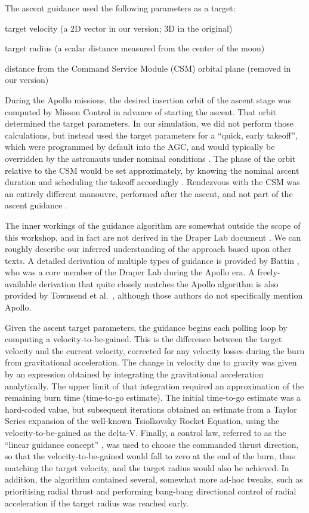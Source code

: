\documentclass[12pt,openany]{book}
\begin{document}
The ascent guidance used the following parameters as a target:
\begin{paritemize}
\item target velocity (a 2D vector in our version; 3D in the original)
\item target radius (a scalar distance measured from the center of the moon)
\item distance from the Command Service Module (CSM) orbital plane (removed in our version)
\end{paritemize}
During the Apollo missions, the desired insertion orbit of the ascent stage was computed by Misson Control in advance of starting the ascent. That orbit determined the target parameters. In our simulation, we did not perform those calculations, but instead used the target parameters for a ``quick, early takeoff'', which were programmed by default into the AGC, and would typically be overridden by the astronauts under nominal conditions \cite{levine1971}. The phase of the orbit relative to the CSM would be set approximately, by knowing the nominal ascent duration and scheduling the takeoff accordingly \cite{levine1971}. Rendezvous with the CSM was an entirely different manouvre, performed after the ascent, and not part of the ascent guidance \cite{levine1971}.

The inner workings of the guidance algorithm are somewhat outside the scope of this workshop, and in fact are not derived in the Draper Lab document \cite{levine1971}. We can roughly describe our inferred understanding of the approach based upon other texts. A detailed derivation of multiple types of guidance is provided by Battin \cite{battin1999}, who was a core member of the Draper Lab during the Apollo era. A freely-available derivation that quite closely matches the Apollo algorithm is also provided by Townsend et al.~\cite{townsend1968}, although those authors do not specifically mention Apollo.

Given the ascent target parameters, the guidance begins each polling loop by computing a velocity-to-be-gained. This is the difference between the target velocity and the current velocity, corrected for any velocity losses during the burn from gravitational acceleration. The change in velocity due to gravity was given by an expression obtained by integrating the gravitational acceleration analytically. The upper limit of that integration required an approximation of the remaining burn time (time-to-go estimate). The initial time-to-go estimate was a hard-coded value, but subsequent iterations obtained an estimate from a Taylor Series expansion of the well-known Tsiolkovsky Rocket Equation, using the velocity-to-be-gained as the delta-V. Finally, a control law, referred to as the ``linear guidance concept'' \cite{levine1971}, was used to choose the commanded thrust direction, so that the velocity-to-be-gained would fall to zero at the end of the burn, thus matching the target velocity, and the target radius would also be achieved. In addition, the algorithm contained several, somewhat more ad-hoc tweaks, such as prioritising radial thrust and performing bang-bang directional control of radial acceleration if the target radius was reached early.
\end{document}

